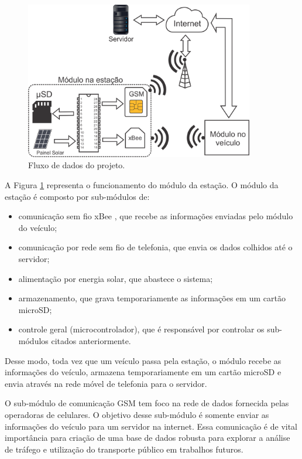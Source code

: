 \documentclass[12pt]{uftpibicsic2018}
\begin{document}
\begin{figure}[!h]
\centering
\includegraphics[width=10cm]{ruti2.png}
\caption{Fluxo de dados do projeto.}
\label{fig:modulo_estacao}
\end{figure}

A Figura \ref{fig:modulo_estacao} representa o funcionamento do módulo da estação. O módulo da estação é composto por sub-módulos de:

\begin{itemize}
\item comunicação sem fio xBee \cite{xbee}, que recebe as informações enviadas pelo módulo do veículo;
\item comunicação por rede sem fio de telefonia, que envia os dados colhidos até o servidor;
\item alimentação por energia solar, que abastece o sistema;
\item armazenamento, que grava temporariamente as informações em um cartão microSD;
\item controle geral (microcontrolador), que é responsável por controlar os sub-módulos citados anteriormente.
\end{itemize}

Desse modo, toda vez que um veículo passa pela estação, o módulo recebe as informações do veículo, armazena temporariamente em um cartão microSD e envia através na rede móvel de telefonia para o servidor.

O sub-módulo de comunicação GSM tem foco na rede de dados fornecida pelas operadoras de celulares. O objetivo desse sub-módulo é somente enviar as informações do veículo para um servidor na internet. Essa comunicação é de vital importância para criação de uma base de dados robusta para explorar a análise de tráfego e utilização do transporte público em trabalhos futuros.
\end{document}
